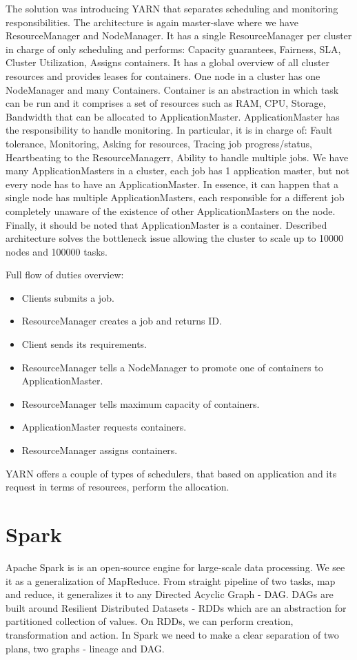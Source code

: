 The solution was introducing YARN that separates scheduling and monitoring responsibilities. The architecture is again master-slave where we have ResourceManager and NodeManager. It has a single ResourceManager per cluster in charge of only scheduling and performs: Capacity guarantees, Fairness, SLA, Cluster Utilization, Assigns containers. It has a global overview of all cluster resources and provides leases for containers. One node in a cluster has one NodeManager and many Containers. Container is an abstraction in which task can be run and it comprises a set of resources such as RAM, CPU, Storage, Bandwidth that can be allocated to ApplicationMaster. ApplicationMaster has the responsibility to handle monitoring. In particular, it is in charge of: Fault tolerance, Monitoring, Asking for resources, Tracing job progress/status, Heartbeating to the ResourceManagerr, Ability to handle multiple jobs. We have many ApplicationMasters in a cluster, each job has 1 application master, but not every node has to have an ApplicationMaster. In essence, it can happen that a single node has multiple ApplicationMasters, each responsible for a different job completely unaware of the existence of other ApplicationMasters on the node. Finally, it should be noted that ApplicationMaster is a container. Described architecture solves the bottleneck issue allowing the cluster to scale up to 10000 nodes and 100000 tasks. \cite{BigDataCourse} %

Full flow of duties overview:
\begin{itemize}
	\item Clients submits a job. 
	\item ResourceManager creates a job and returns ID. \item Client sends its requirements. 
	\item ResourceManager tells a NodeManager to promote one of containers to ApplicationMaster. 
	\item ResourceManager tells maximum capacity of containers. 
	\item ApplicationMaster requests containers. 
	\item ResourceManager assigns containers.
\end{itemize}


YARN offers a couple of types of schedulers, that based on application and its request in terms of resources, perform the allocation.

\section{Spark}
Apache Spark \cite{ApacheSpark} \cite{SparkDefinitiveGuide} \cite{LearningSpark} is is an open-source engine for large-scale data processing. We see it as a generalization of MapReduce. From straight pipeline of two tasks, map and reduce, it generalizes it to any Directed Acyclic Graph - DAG. DAGs are built around Resilient Distributed Datasets - RDDs \cite{RDD} which are an abstraction for partitioned collection of values. On RDDs, we can perform creation, transformation and action. In Spark we need to make a clear separation of two plans, two graphs - lineage and DAG.

